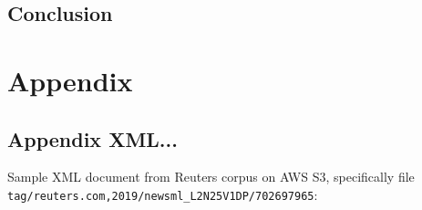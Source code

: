 \documentclass[11pt]{article}
\begin{document}
\subsection{Conclusion}


\newpage

\section{Appendix}
\subsection{Appendix XML...}
\label{sec:AppendixXML}
Sample XML document from Reuters corpus on AWS S3, specifically file \lstinline{tag/reuters.com,2019/newsml_L2N25V1DP/702697965}:
\\
\end{document}
